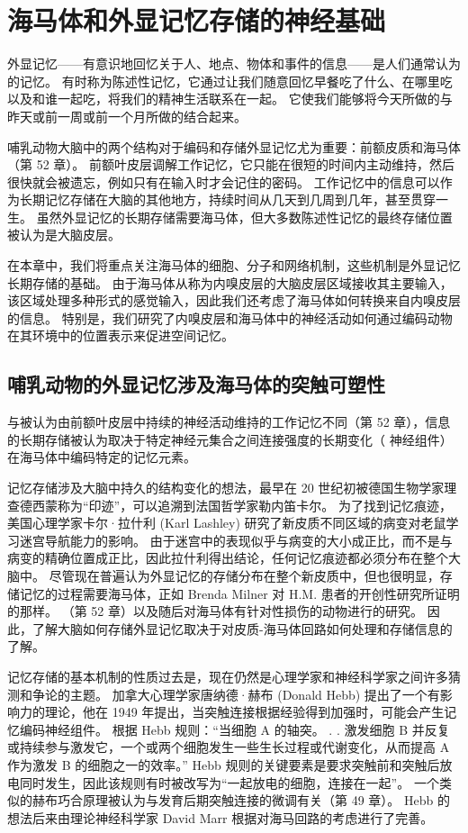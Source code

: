 \chapter{海马体和外显记忆存储的神经基础}

外显记忆——有意识地回忆关于人、地点、物体和事件的信息——是人们通常认为的记忆。 有时称为陈述性记忆，它通过让我们随意回忆早餐吃了什么、在哪里吃以及和谁一起吃，将我们的精神生活联系在一起。 它使我们能够将今天所做的与昨天或前一周或前一个月所做的结合起来。

哺乳动物大脑中的两个结构对于编码和存储外显记忆尤为重要：前额皮质和海马体（第 52 章）。 前额叶皮层调解工作记忆，它只能在很短的时间内主动维持，然后很快就会被遗忘，例如只有在输入时才会记住的密码。 工作记忆中的信息可以作为长期记忆存储在大脑的其他地方，持续时间从几天到几周到几年，甚至贯穿一生。 虽然外显记忆的长期存储需要海马体，但大多数陈述性记忆的最终存储位置被认为是大脑皮层。

在本章中，我们将重点关注海马体的细胞、分子和网络机制，这些机制是外显记忆长期存储的基础。 由于海马体从称为内嗅皮层的大脑皮层区域接收其主要输入，该区域处理多种形式的感觉输入，因此我们还考虑了海马体如何转换来自内嗅皮层的信息。 特别是，我们研究了内嗅皮层和海马体中的神经活动如何通过编码动物在其环境中的位置表示来促进空间记忆。


\section{哺乳动物的外显记忆涉及海马体的突触可塑性}
与被认为由前额叶皮层中持续的神经活动维持的工作记忆不同（第 52 章），信息的长期存储被认为取决于特定神经元集合之间连接强度的长期变化（ 神经组件）在海马体中编码特定的记忆元素。

记忆存储涉及大脑中持久的结构变化的想法，最早在 20 世纪初被德国生物学家理查德西蒙称为“印迹”，可以追溯到法国哲学家勒内笛卡尔。 为了找到记忆痕迹，美国心理学家卡尔·拉什利 (Karl Lashley) 研究了新皮质不同区域的病变对老鼠学习迷宫导航能力的影响。 由于迷宫中的表现似乎与病变的大小成正比，而不是与病变的精确位置成正比，因此拉什利得出结论，任何记忆痕迹都必须分布在整个大脑中。 尽管现在普遍认为外显记忆的存储分布在整个新皮质中，但也很明显，存储记忆的过程需要海马体，正如 Brenda Milner 对 H.M. 患者的开创性研究所证明的那样。 （第 52 章）以及随后对海马体有针对性损伤的动物进行的研究。 因此，了解大脑如何存储外显记忆取决于对皮质-海马体回路如何处理和存储信息的了解。

记忆存储的基本机制的性质过去是，现在仍然是心理学家和神经科学家之间许多猜测和争论的主题。 加拿大心理学家唐纳德·赫布 (Donald Hebb) 提出了一个有影响力的理论，他在 1949 年提出，当突触连接根据经验得到加强时，可能会产生记忆编码神经组件。 根据 Hebb 规则：“当细胞 A 的轴突。 . . 激发细胞 B 并反复或持续参与激发它，一个或两个细胞发生一些生长过程或代谢变化，从而提高 A 作为激发 B 的细胞之一的效率。” Hebb 规则的关键要素是要求突触前和突触后放电同时发生，因此该规则有时被改写为“一起放电的细胞，连接在一起”。 一个类似的赫布巧合原理被认为与发育后期突触连接的微调有关（第 49 章）。 Hebb 的想法后来由理论神经科学家 David Marr 根据对海马回路的考虑进行了完善。

